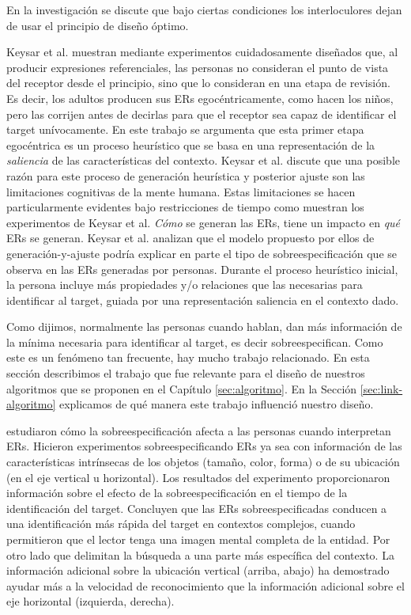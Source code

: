 En la investigaci\'on \cite{keysar:Curr98} se discute que bajo ciertas condiciones los interloculores dejan de usar el principio de dise\~no \'optimo. %

Keysar et al. muestran mediante experimentos cuidadosamente dise\~nados que, al producir expresiones referenciales, las personas no consideran el punto de vista del receptor desde el principio, sino que lo consideran en una etapa de revisi\'on. Es decir, los adultos producen sus ERs egoc\'entricamente, como hacen los ni\~nos, pero las corrijen antes de decirlas para que el receptor sea capaz de identificar el target un\'ivocamente.
En este trabajo se argumenta que esta primer etapa egoc\'entrica es un proceso heur\'istico que se basa en una representaci\'on de la \emph{saliencia} de las caracter\'isticas del contexto. Keysar et al. discute que una posible raz\'on para este proceso de generaci\'on heur\'istica y posterior ajuste son las limitaciones cognitivas de la mente humana. Estas limitaciones se hacen particularmente evidentes bajo restricciones de tiempo como muestran los experimentos de Keysar et al.
\emph{C\'omo} se generan las ERs, tiene un impacto en \emph{qu\'e} ERs se generan. Keysar et al. analizan que el modelo propuesto por ellos de generaci\'on-y-ajuste podr\'ia explicar en parte el tipo de sobreespecificaci\'on que se observa en las ERs generadas por personas. Durante el proceso heur\'istico inicial, la persona incluye m\'as propiedades y/o relaciones que las necesarias para identificar al target, guiada por una representaci\'on saliencia en el contexto dado.

Como dijimos, normalmente las personas cuando hablan, dan m\'as informaci\'on de la m\'inima necesaria para identificar al target, es decir sobreespecifican. Como este es un fen\'omeno tan frecuente, hay mucho trabajo relacionado. En esta secci\'on describimos el trabajo que fue relevante para el dise\~no de nuestros algoritmos que se proponen en el Cap\'itulo \ref{sec:algoritmo}. En la Secci\'on \ref{sec:link-algoritmo} explicamos de qu\'e manera este trabajo influenci\'o nuestro dise\~no.

\cite{arts} estudiaron c\'omo la sobreespecificaci\'on afecta a las personas cuando interpretan ERs. Hicieron experimentos sobreespecificando ERs ya sea con informaci\'on de las caracter\'isticas intr\'insecas de los objetos (tama\~no, color, forma) o de su ubicaci\'on (en el eje vertical u horizontal). Los resultados del experimento
proporcionaron informaci\'on sobre el efecto de la sobreespecificaci\'on en el tiempo de la identificaci\'on del target.
Concluyen que las ERs sobreespecificadas conducen a una identificaci\'on m\'as r\'apida del target en contextos complejos, cuando permitieron que el lector 
tenga una imagen mental completa de la entidad. Por otro lado que delimitan la b\'usqueda a una parte m\'as espec\'ifica
del contexto. La informaci\'on adicional sobre la ubicaci\'on vertical (arriba, abajo) ha demostrado ayudar m\'as a la velocidad de reconocimiento que la informaci\'on adicional sobre el eje horizontal (izquierda, derecha).

